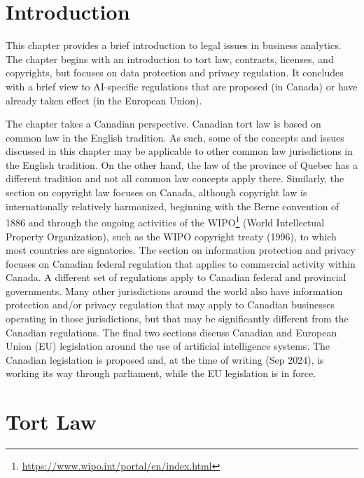 %
%

\section{Introduction}

This chapter provides a brief introduction to legal issues in business analytics. The chapter begins with an introduction to tort law, contracts, licenses, and copyrights, but focuses on data protection and privacy regulation. It concludes with a brief view to AI-specific regulations that are proposed (in Canada) or have already taken effect (in the European Union). 

The chapter takes a Canadian perspective. Canadian tort law is based on common law in the English tradition. As such, some of the concepts and issues discussed in this chapter may be applicable to other common law jurisdictions in the English tradition. On the other hand, the law of the province of Quebec has a different tradition and not all common law concepts apply there. Similarly, the section on copyright law focuses on Canada, although copyright law is internationally relatively harmonized, beginning with the Berne convention of 1886 and through the ongoing activities of the WIPO\footnote{\url{https://www.wipo.int/portal/en/index.html}}  (World Intellectual Property Organization), such as the WIPO copyright treaty (1996), to which most countries are signatories. The section on information protection and privacy focuses on Canadian federal regulation that applies to commercial activity within Canada. A different set of regulations apply to Canadian federal and provincial governments. Many other jurisdictions around the world also have information protection and/or privacy regulation that may apply to Canadian businesses operating in those jurisdictions, but that may be significantly different from the Canadian regulations. The final two sections discuss Canadian and European Union (EU) legislation around the use of artificial intelligence systems. The Canadian legislation is proposed and, at the time of writing (Sep 2024), is working its way through parliament, while the EU legislation is in force. 

\section{Tort Law}

